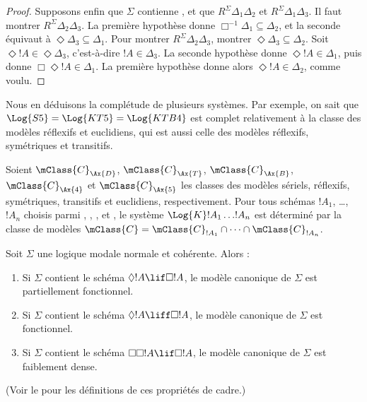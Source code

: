 \documentclass[../../../include/open-logic-section]{subfiles}
\begin{document}
\begin{proof}
  Supposons enfin que $\Sigma$ contienne , et que $R^\Sigma
  \Delta_1\Delta_2$ et $R^\Sigma \Delta_1\Delta_3$. Il faut montrer
  $R^\Sigma \Delta_2\Delta_3$. La première hypothèse donne
  $\Box^{-1}\Delta_1 \subseteq \Delta_2$, et la seconde équivaut à
  $\Diamond\Delta_3 \subseteq \Delta_1$. Pour montrer $R^\Sigma
  \Delta_2\Delta_3$, montrer
  $\Diamond\Delta_3 \subseteq \Delta_2$. Soit $\Diamond!A \in
  \Diamond\Delta_3$, c'est-à-dire $!A \in \Delta_3$. La seconde
  hypothèse donne $\Diamond!A \in \Delta_1$, puis  donne
  $\Box\Diamond!A \in \Delta_1$. La première hypothèse donne alors
  $\Diamond!A \in \Delta_2$, comme voulu.
\end{proof}

Nous en déduisons la complétude de plusieurs systèmes. Par exemple,
on sait que $\Log{S5} = \Log{KT5} = \Log{KTB4}$ est complet
relativement à la classe des modèles réflexifs et euclidiens, qui est
aussi celle des modèles réflexifs, symétriques et transitifs.

\begin{thm}
  Soient $\mClass{C}_\Ax{D}$, $\mClass{C}_\Ax{T}$,
  $\mClass{C}_\Ax{B}$, $\mClass{C}_\Ax{4}$ et
  $\mClass{C}_\Ax{5}$ les classes des modèles sériels, réflexifs,
  symétriques, transitifs et euclidiens, respectivement. Pour tous
  schémas $!A_1$, \dots, $!A_n$ choisis parmi ,
  , ,  et , le système
  $\Log{K}!A_1 \dots !A_n$ est déterminé par la classe de modèles
  $\mClass{C} = \mClass{C}_{!A_1} \cap \dots
  \cap \mClass{C}_{!A_n}$.
\end{thm}

\begin{prop}
  Soit $\Sigma$ une logique modale normale et cohérente. Alors :
  \begin{enumerate}
  \item{}%
    Si $\Sigma$ contient le schéma $\Diamond!A \lif \Box
    !A$, le modèle canonique de $\Sigma$ est partiellement fonctionnel.
  \item Si $\Sigma$ contient le schéma $\Diamond!A \liff \Box
    !A$, le modèle canonique de $\Sigma$ est fonctionnel.
  \item Si $\Sigma$ contient le schéma $\Box\Box!A \lif \Box
    !A$, le modèle canonique de $\Sigma$ est faiblement dense.
  \end{enumerate}
  (Voir le  pour les définitions de ces
  propriétés de cadre.)
\end{prop}
\end{document}
